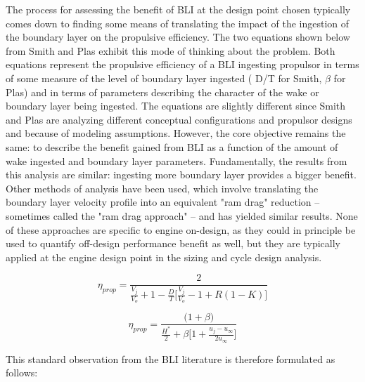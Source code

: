 The process for assessing the benefit of BLI at the design point chosen typically comes down to finding some means of translating the impact of the ingestion of the boundary layer on the propulsive efficiency.  The two equations shown below from Smith and Plas exhibit this mode of thinking about the problem.  Both equations represent the propulsive efficiency of a BLI ingesting propulsor in terms of some measure of the level of boundary layer ingested ( D/T for Smith, $\beta$ for Plas) and in terms of parameters describing the character of the wake or boundary layer being ingested.  The equations are slightly different since Smith and Plas are analyzing different conceptual configurations and propulsor designs and because of modeling assumptions.  However, the core objective remains the same:  to describe the benefit gained from BLI as a function of the amount of wake ingested and boundary layer parameters.  Fundamentally, the results from this analysis are similar:  ingesting more boundary layer provides a bigger benefit.  Other methods of analysis have been used, which involve translating the boundary layer velocity profile into an equivalent "ram drag" reduction -- sometimes called the "ram drag approach" -- and has yielded similar results.  None of these approaches are specific to engine on-design, as they could in principle be used to quantify off-design performance benefit as well, but they are typically applied at the engine design point in the sizing and cycle design analysis.
  
   \begin{equation}\eta_{prop} = \frac{2}{\displaystyle\frac{V_j}{V_o} + 1 - \frac{D}{T}\Big[\displaystyle\frac{V_j}{V_o} -1 + R (1-K)\Big]}  \label{Smith_Propulsive_Efficiency}\end{equation}%

   \begin{equation}\eta_{prop} = \frac{\Big(1+\beta\Big)}
					{\displaystyle \frac{H^*}{2} + \beta\Big[1+\frac{u_j-u_\infty}{2u_\infty}\Big]}\label{Plas_Propulsive_Efficiency}\end{equation}%

\vspace{15pt}
This standard observation from the BLI literature is therefore formulated as follows:

\vspace{1pt}
\vspace{5mm}
\vspace{5mm}

